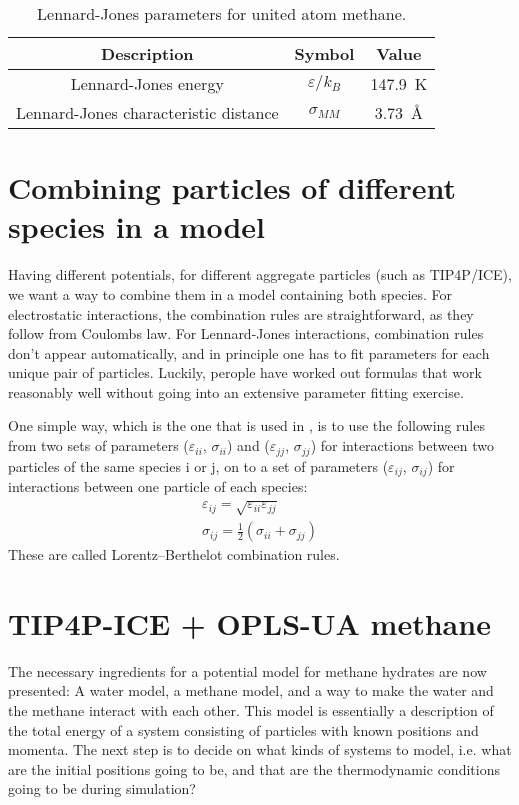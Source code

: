 \begin{table}
\caption{Lennard-Jones parameters for united atom methane.}
\label{tb:parameters_unitedatommethane}
\begin{center}
\begin{tabular}{c|c|c}
Description & Symbol & Value \\
\hline
Lennard-Jones energy & $\varepsilon/k_B$ & \SI{147.9}{\kelvin} \\
Lennard-Jones characteristic distance & $\sigma_{MM}$ & \SI{3.73}{\angstrom}
\end{tabular}
\end{center}
\end{table}

\section{Combining particles of different species in a model}
Having different potentials, for different aggregate particles (such as TIP4P/ICE), we want a way to combine them in a model containing both species. For electrostatic interactions, the combination rules are straightforward, as they follow from Coulombs law. For Lennard-Jones interactions, combination rules don't appear automatically, and in principle one has to fit parameters for each unique pair of particles. Luckily, perople have worked out formulas that work reasonably well without going into an extensive parameter fitting exercise. 

One simple way, which is the one that is used in \citet{Walsh2009}, is to use the following rules from two sets of parameters ($\varepsilon_{ii}$, $\sigma_{ii}$) and ($\varepsilon_{jj}$, $\sigma_{jj}$) for interactions between two particles of the same species i or j, on to a set of parameters ($\varepsilon_{ij}$, $\sigma_{ij}$) for interactions between one particle of each species:
\begin{align}
\varepsilon_{ij} = \sqrt{\varepsilon_{ii}\varepsilon_{jj}} \\
\sigma_{ij} = \frac{1}{2} \left(\sigma_{ii}+\sigma_{jj}\right)
\end{align}
These are called Lorentz--Berthelot combination rules.

\section{TIP4P-ICE + OPLS-UA methane}
The necessary ingredients for a potential model for methane hydrates are now presented: A water model, a methane model, and a way to make the water and the methane interact with each other. This model is essentially a description of the total energy of a system consisting of particles with known positions and momenta. The next step is to decide on what kinds of systems to model, i.e. what are the initial positions going to be, and that are the thermodynamic conditions going to be during simulation?

